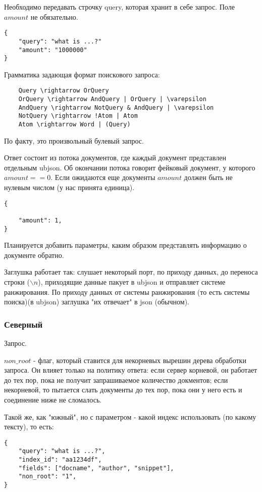 \documentclass[12pt,a4paper]{article}
\begin{document}
Необходимо передавать строчку query, которая хранит в себе запрос.
Поле $amount$ не обязательно.
\begin{verbatim}
{
	"query": "what is ...?"
	"amount": "1000000"
}
\end{verbatim}

Грамматика задающая формат поискового запроса:
\begin{verbatim}
	Query \rightarrow OrQuery
	OrQuery \rightarrow AndQuery | OrQuery | \varepsilon
	AndQuery \rightarrow NotQuery & AndQuery | \varepsilon
	NotQuery \rightarrow !Atom | Atom
	Atom \rightarrow Word | (Query)
\end{verbatim}
По факту, это произвольный булевый запрос.

Ответ состоит из потока документов, где каждый документ представлен отдельным ubjson. Об окончании потока говорит фейковый документ, у которого $amount == 0$. Если ожидаются еще документы $amount$ должен быть не нулевым числом (у нас принята единица).
\begin{verbatim}
{
	
	"amount": 1,
}
\end{verbatim}


Планируется добавить параметры, каким образом представлять информацию о документе обратно.

Заглушка работает так: слушает некоторый порт, по приходу данных, до переноса строки ($\backslash n$), приходящие данные пакует в ubjson и отправляет системе ранжирования. По приходу данных от системы ранжирования (то есть системы поиска)(в ubjson) заглушка "их отвечает" в json (обычном).

\subsubsection{Северный}
Запрос.

$non\_root$ - флаг, который ставится для некорневых вырешин дерева обработки запроса. Он влияет только на политику ответа: если сервер корневой, он работает до тех пор, пока не получит запрашиваемое количество докментов; если некорневой, то пытается слать документы до тех пор, пока они у него есть и соединение ниже не сломалось.

Такой же, как "южный", но с параметром - какой индекс использовать (по какому тексту), то есть:
\begin{verbatim}
{
	"query": "what is ...?",
	"index_id": "aa1234df",
	"fields": ["docname", "author", "snippet"],
	"non_root": "1",
}
\end{verbatim}
\end{document}
